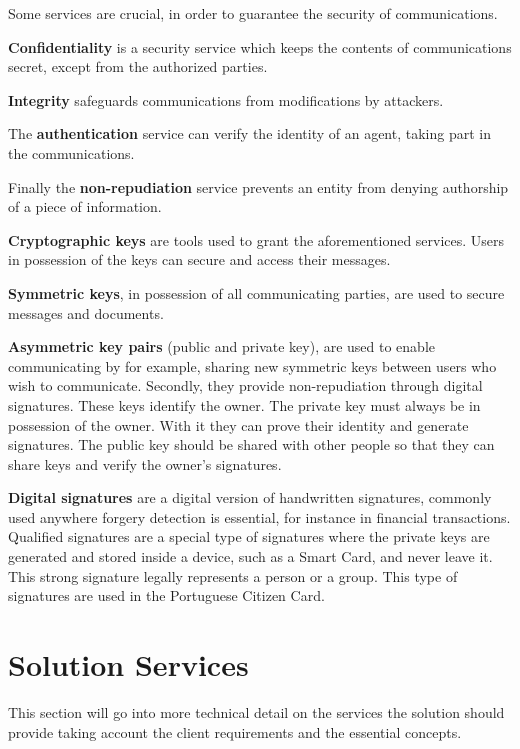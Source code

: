 Some services are crucial, in order to guarantee the security of communications.

\textbf{Confidentiality} is a security service which keeps the contents of communications secret, except from the authorized parties.

\textbf{Integrity} safeguards communications from modifications by attackers.

The \textbf{authentication} service can verify the identity of an agent, taking part in the communications.

Finally the \textbf{non-repudiation} service prevents an entity from denying authorship of a piece of information.

\textbf{Cryptographic keys} are tools used to grant the aforementioned services. Users in possession of the keys can secure and access their messages.

\textbf{Symmetric keys}, in possession of all communicating parties, are used to secure messages and documents.

\textbf{Asymmetric key pairs} (public and private key), are used to enable communicating by for example, sharing new symmetric keys between users who wish to communicate. Secondly, they provide non-repudiation through digital signatures.
These keys identify the owner. The private key must always be in possession of the owner. With it they can prove their identity and generate signatures.
The public key should be shared with other people so that they can share keys and verify the owner's signatures.

\textbf{Digital signatures} are a digital version of handwritten signatures, commonly used anywhere forgery detection is essential, for instance in financial transactions.
Qualified signatures are a special type of signatures where the private keys are generated and stored inside a device, such as a Smart Card, and never leave it.
This strong signature legally represents a person or a group. This type of signatures are used in the Portuguese Citizen Card.

\section{Solution Services} \label{chap:problem:services}


This section will go into more technical detail on the services the solution should provide taking account the client requirements and the essential concepts.

